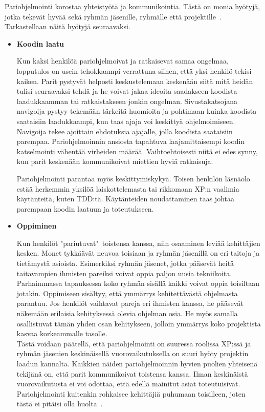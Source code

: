 \documentclass[finnish]{../tktltiki2}
\theoremstyle{definition}
\theoremstyle{remark}
\begin{document}
Pariohjelmointi korostaa yhteistyötä ja kommunikointia. Tästä on monia 
hyötyjä, jotka tekevät hyvää sekä ryhmän jäsenille, ryhmälle että 
projektille~\cite{Begel:2008:PPW:1414004.1414026}. Tarkastellaan näitä 
hyötyjä seuraavaksi. 

\begin{itemize}

\item {\bf Koodin laatu}

Kun kaksi henkilöä pariohjelmoivat ja ratkaisevat samaa ongelmaa, 
lopputulos on usein tehokkaampi verrattuna siihen, että yksi henkilö 
tekisi kaiken. Parit pystyvät helposti keskustelemaan keskenään siitä 
mitä heidän tulisi seuraavaksi tehdä ja he voivat jakaa ideoita 
saadakseen koodista laadukkaamman tai ratkaistakseen jonkin ongelman. 
Sivustakatsojana navigoija pystyy tekemään tärkeitä huomioita ja 
pohtimaan kuinka koodista saataisiin laadukkaampi, kun taas ajaja voi 
keskittyä ohjelmoimiseen. Navigoija tekee ajoittain ehdotuksia 
ajajalle, jolla koodista saataisiin parempaa.
Pariohjelmoinnin ansiosta tapahtuva laajamittaisempi koodin 
katselmointi vähentää virheiden määrää. Vaihtoehtoisesti
niitä ei edes synny, kun parit keskenään kommunikoivat miettien hyviä 
ratkaisuja.

Pariohjelmointi parantaa myös keskittymiskykyä. Toisen henkilön 
läsnäolo estää herkemmin yksilöä laiskottelemasta tai rikkomaan XP:n
vaalimia käytänteitä, kuten TDD:tä. Käytänteiden noudattaminen taas 
johtaa parempaan koodin laatuun ja toteutukseen.

\item {\bf Oppiminen}

Kun henkilöt "pariutuvat"~toistensa kanssa, niin osaaminen 
leviää kehittäjien kesken. Monet tykkäävät neuvoa toisiaan ja ryhmän 
jäsenillä
on eri taitoja ja tietämystä asioista. Esimerkiksi ryhmän jäsenet, 
jotka pääsevät heitä taitavampien ihmisten pareiksi voivat oppia
paljon uusia tekniikoita. Parhaimmassa tapauksessa koko ryhmän sisällä 
kaikki voivat oppia toisiltaan jotakin.
Oppimiseen sisältyy, että ymmärrys kehitettävästä ohjelmasta 
parantuu. Jos henkilöt vaihtavat
pareja eri ihmisten kanssa, he pääsevät näkemään erilaisia 
kehityksessä olevia ohjelman osia. He myös samalla osallistuvat tämän 
yhden osan
kehitykseen, jolloin ymmärrys koko projektista kasvaa korkeammalle 
tasolle.\\

Tästä voidaan päätellä, että pariohjelmointi on suuressa roolissa 
XP:ssä ja ryhmän jäsenien keskinäisellä vuorovaikutuksella on suuri 
hyöty projektin laadun kannalta. Kaikkien näiden pariohjelmoinnin 
hyvien puolien yhteisenä tekijänä on, että parit kommunikoivat 
toistensa kanssa. Ilman keskinäistä vuorovaikutusta ei voi odottaa, 
että edellä mainitut asiat toteutuisivat. Pariohjelmointi kuitenkin 
rohkaisee kehittäjiä puhumaan toisilleen, joten tästä ei pitäisi olla 
huolta~\cite{Zarb:2012:UCW:2384716.2384738}.

\end{itemize}
\end{document}

